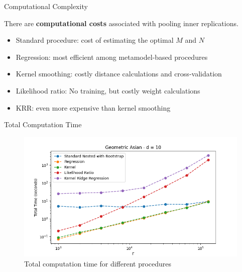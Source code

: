 \documentclass[9pt,handout]{beamer}
\begin{document}
\begin{frame}{Computational Complexity}

    There are \textbf{computational costs} associated with pooling inner replications.

    \begin{itemize}
        \item Standard procedure: cost of estimating the optimal $M$ and $N$
        \item Regression: most efficient among metamodel-based procedures
        \item Kernel smoothing: costly distance calculations and cross-validation
        \item Likelihood ratio: No training, but costly weight calculations
        \item KRR: even more expensive than kernel smoothing
    \end{itemize}

\end{frame}

\begin{frame}{Total Computation Time}

    \begin{figure}
        \includegraphics[width=\textwidth]{../project1/figures/figure11b.png}
        \caption{Total computation time for different procedures}
    \end{figure}

\end{frame}
\end{document}
